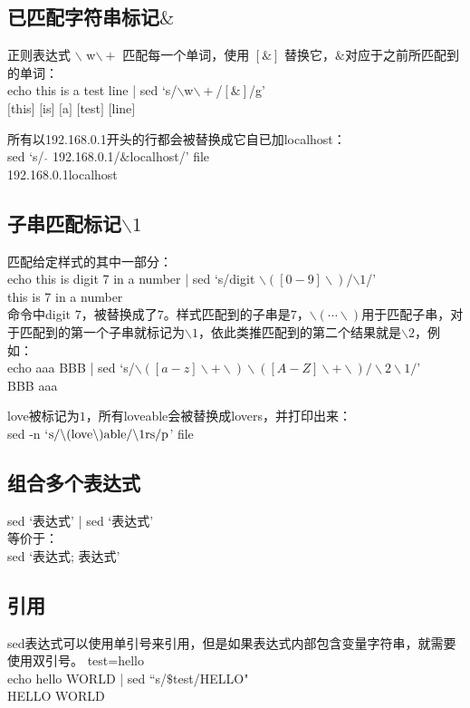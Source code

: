 \documentclass[12pt,a4paper]{article}
\begin{document}
\subsection{已匹配字符串标记$\&$}
正则表达式 $\backslash$ w$\backslash +$ 匹配每一个单词，使用 $[\&]$ 替换它，$\&$对应于之前所匹配到的单词：\\
echo this is a test line | sed `s/$\backslash$w$\backslash +$/$[\&]$/g' \\
$[$this$]$ $[$is$]$ $[$a$]$ $[$test$]$ $[$line$]$ 

所有以192.168.0.1开头的行都会被替换成它自已加localhost：\\
sed `s/ $\hat{}$ 192.168.0.1/$\&$localhost/' file \\
192.168.0.1localhost

\subsection{子串匹配标记$\backslash 1$}
匹配给定样式的其中一部分：\\
echo this is digit 7 in a number | sed `s/digit $\backslash([0-9]\backslash)$/$\backslash 1$/' \\
this is 7 in a number \\

命令中digit $7$，被替换成了$7$。样式匹配到的子串是$7$，$\backslash(\cdots \backslash)$用于匹配子串，对于匹配到的第一个子串就标记为$\backslash 1$，依此类推匹配到的第二个结果就是$\backslash 2$，例如：\\
echo aaa BBB | sed `s/$\backslash ([a-z]\backslash +\backslash) \backslash([A-Z]\backslash +\backslash)/\backslash 2 \backslash 1/$' \\
BBB aaa

love被标记为$1$，所有loveable会被替换成lovers，并打印出来：\\
sed -n `${\rm s}/\backslash ({\rm love}\backslash) {\rm able}/\backslash 1 {\rm rs/p}$' file

\subsection{组合多个表达式}
sed `表达式' | sed `表达式'\\
等价于：\\
sed `表达式; 表达式'

\subsection{引用}
sed表达式可以使用单引号来引用，但是如果表达式内部包含变量字符串，就需要使用双引号。
test=hello\\
echo hello WORLD | sed ``s/$\$$test/HELLO" \\
HELLO WORLD 
\end{document}
